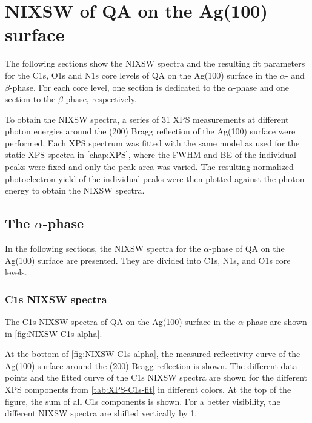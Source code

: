 \chapter{NIXSW of QA on the Ag(100) surface}

The following sections show the \ac{NIXSW} spectra and the resulting fit parameters for the C1s, O1s and N1s core levels of \ac{QA} on the Ag(100) surface in the $\alpha$- and $\beta$-phase. For each core level, one section is dedicated to the $\alpha$-phase and one section to the $\beta$-phase, respectively.

To obtain the \ac{NIXSW} spectra, a series of 31 \ac{XPS} measurements at different photon energies around the (200) Bragg reflection of the Ag(100) surface were performed. Each \ac{XPS} spectrum was fitted with the same model as used for the static \ac{XPS} spectra in \autoref{chap:XPS}, where the \ac{FWHM} and \ac{BE} of the individual peaks were fixed and only the peak area was varied. The resulting normalized photoelectron yield of the individual peaks were then plotted against the photon energy to obtain the \ac{NIXSW} spectra.

\section{The \texorpdfstring{$\alpha$}{alpha}-phase}
\label{chap:NIXSW-alpha}

In the following sections, the \ac{NIXSW} spectra for the $\alpha$-phase of \ac{QA} on the Ag(100) surface are presented. They are divided into C1s, N1s, and O1s core levels.

\subsection{C1s NIXSW spectra}
\label{chap:C1s-NIXSW}

The C1s \ac{NIXSW} spectra of \ac{QA} on the Ag(100) surface in the $\alpha$-phase are shown in \autoref{fig:NIXSW-C1s-alpha}.

At the bottom of \autoref{fig:NIXSW-C1s-alpha}, the measured reflectivity curve of the Ag(100) surface around the (200) Bragg reflection is shown. The different data points and the fitted curve of the C1s \ac{NIXSW} spectra are shown for the different \ac{XPS} components from \autoref{tab:XPS-C1s-fit} in different colors. At the top of the figure, the sum of all C1s components is shown. For a better visibility, the different \ac{NIXSW} spectra are shifted vertically by 1.

